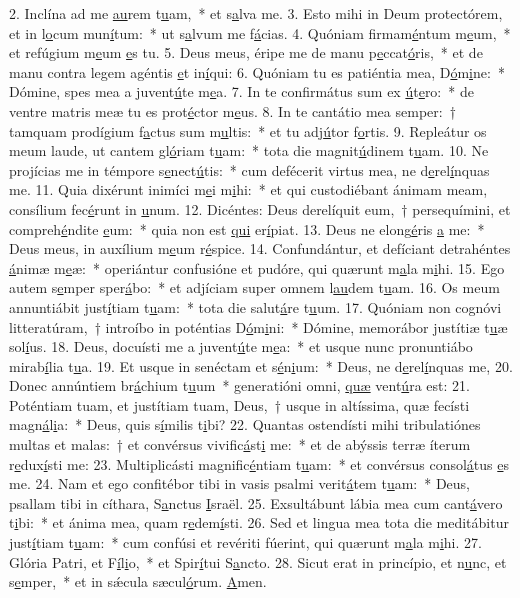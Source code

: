 2. Inclína ad me \uline{au}rem t\uline{u}am,~* et s\uline{a}lva me.
3. Esto mihi in Deum protectórem, et in l\uline{o}cum mun\uline{í}tum:~* ut s\uline{a}lvum me f\uline{á}cias.
4. Quóniam firmam\uline{é}ntum m\uline{e}um,~* et refúgium m\uline{e}um \uline{e}s tu.
5. Deus meus, éripe me de manu p\uline{e}ccat\uline{ó}ris,~* et de manu contra legem agéntis \uline{e}t in\uline{í}qui:
6. Quóniam tu es patiéntia mea, D\uline{ó}m\uline{i}ne:~* Dómine, spes mea a juvent\uline{ú}te m\uline{e}a.
7. In te confirmátus sum ex \uline{ú}t\uline{e}ro:~* de ventre matris meæ tu es prot\uline{é}ctor m\uline{e}us.
8. In te cantátio mea semper:~† tamquam prodígium f\uline{a}ctus sum m\uline{u}ltis:~* et tu adj\uline{ú}tor f\uline{o}rtis.
9. Repleátur os meum laude, ut cantem gl\uline{ó}riam t\uline{u}am:~* tota die magnit\uline{ú}dinem t\uline{u}am.
10. Ne projícias me in témpore s\uline{e}nect\uline{ú}tis:~* cum defécerit virtus mea, ne d\uline{e}rel\uline{í}nquas me.
11. Quia dixérunt inimíci m\uline{e}i m\uline{i}hi:~* et qui custodiébant ánimam meam, consílium fec\uline{é}runt in \uline{u}num.
12. Dicéntes: Deus derelíquit eum,~† persequímini, et compreh\uline{é}ndite \uline{e}um:~* quia non est \uline{qui} er\uline{í}piat.
13. Deus ne elong\uline{é}ris \uline{a} me:~* Deus meus, in auxílium m\uline{e}um r\uline{é}spice.
14. Confundántur, et defíciant detrahéntes \uline{á}nimæ m\uline{e}æ:~* operiántur confusióne et pudóre, qui quærunt m\uline{a}la m\uline{i}hi.
15. Ego autem s\uline{e}mper sper\uline{á}bo:~* et adjíciam super omnem l\uline{au}dem t\uline{u}am.
16. Os meum annuntiábit just\uline{í}tiam t\uline{u}am:~* tota die salut\uline{á}re t\uline{u}um.
17. Quóniam non cognóvi litteratúram,~† introíbo in poténtias D\uline{ó}m\uline{i}ni:~* Dómine, memorábor justítiæ t\uline{u}æ sol\uline{í}us.
18. Deus, docuísti me a juvent\uline{ú}te m\uline{e}a:~* et usque nunc pronuntiábo mirab\uline{í}lia t\uline{u}a.
19. Et usque in senéctam et s\uline{é}n\uline{i}um:~* Deus, ne d\uline{e}rel\uline{í}nquas me,
20. Donec annúntiem br\uline{á}chium t\uline{u}um~* generatióni omni, \uline{quæ} vent\uline{ú}ra est:
21. Poténtiam tuam, et justítiam tuam, Deus,~† usque in altíssima, quæ fecísti magn\uline{á}l\uline{i}a:~* Deus, quis s\uline{í}milis t\uline{i}bi?
22. Quantas ostendísti mihi tribulatiónes multas et malas:~† et convérsus vivific\uline{á}st\uline{i} me:~* et de abýssis terræ íterum r\uline{e}dux\uline{í}sti me:
23. Multiplicásti magnific\uline{é}ntiam t\uline{u}am:~* et convérsus consol\uline{á}tus \uline{e}s me.
24. Nam et ego confitébor tibi in vasis psalmi verit\uline{á}tem t\uline{u}am:~* Deus, psallam tibi in cíthara, S\uline{a}nctus \uline{I}sraël.
25. Exsultábunt lábia mea cum cant\uline{á}vero t\uline{i}bi:~* et ánima mea, quam r\uline{e}dem\uline{í}sti.
26. Sed et lingua mea tota die meditábitur just\uline{í}tiam t\uline{u}am:~* cum confúsi et revériti fúerint, qui quærunt m\uline{a}la m\uline{i}hi.
27. Glória Patri, et F\uline{í}l\uline{i}o,~* et Spir\uline{í}tui S\uline{a}ncto.
28. Sicut erat in princípio, et n\uline{u}nc, et s\uline{e}mper,~* et in sǽcula sæcul\uline{ó}rum. \uline{A}men.
